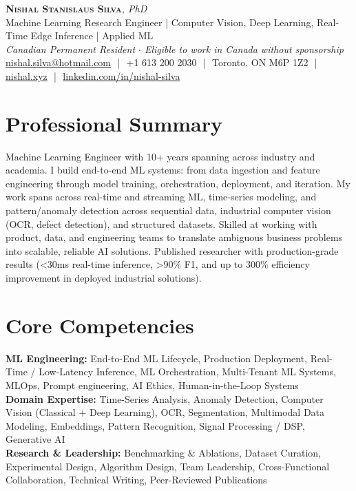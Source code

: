 \documentclass[11pt]{article}
\begin{document}
\pagestyle{empty}
\begin{center}
    {\LARGE \scshape \textbf{Nishal Stanislaus Silva}}{\large \textit{, PhD}}
    \\[1pt]
    {\small Machine Learning Research Engineer | Computer Vision, Deep Learning, Real-Time Edge Inference | Applied ML}
    \\[1pt]
    {\footnotesize\textit{Canadian Permanent Resident $\cdot$ Eligible to work in Canada without sponsorship}}
    \\[1pt]
    {\small \href{mailto:nishal.silva@hotmail.com}{nishal.silva@hotmail.com}
    \,\,|\,\, +1 613 200 2030
    \,\,|\,\, Toronto, ON M6P 1Z2
    \,\,|\,\, \href{https://nishal.xyz}{nishal.xyz}
    \,\,|\,\, \href{https://www.linkedin.com/in/nishal-silva}{linkedin.com/in/nishal-silva}}
\end{center}

\section*{Professional Summary}
Machine Learning Engineer with 10+ years spanning across industry and academia. I build end-to-end ML systems: from data ingestion and feature engineering through model training, orchestration, deployment, and iteration. My work spans across real-time and streaming ML, time-series modeling, and pattern/anomaly detection across sequential data, industrial computer vision (OCR, defect detection), and structured datasets. Skilled at working with product, data, and engineering teams to translate ambiguous business problems into scalable, reliable AI solutions. Published researcher with production-grade results (<30ms real-time inference, >90\% F1, and up to 300\% efficiency improvement in deployed industrial solutions).

\section*{Core Competencies}
\textbf{ML Engineering:} End-to-End ML Lifecycle, Production Deployment, Real-Time / Low-Latency Inference, ML Orchestration, Multi-Tenant ML Systems, MLOps, Prompt engineering, AI Ethics, Human-in-the-Loop Systems\\
\textbf{Domain Expertise:} Time-Series Analysis, Anomaly Detection, Computer Vision (Classical + Deep Learning), OCR, Segmentation, Multimodal Data Modeling, Embeddings, Pattern Recognition, Signal Processing / DSP, Generative AI\\
\textbf{Research \& Leadership:} Benchmarking \& Ablations, Dataset Curation, Experimental Design, Algorithm Design, Team Leadership, Cross-Functional Collaboration, Technical Writing, Peer-Reviewed Publications
\end{document}
